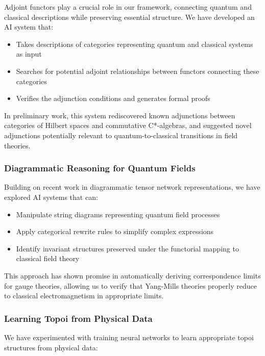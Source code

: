 Adjoint functors play a crucial role in our framework, connecting quantum and classical descriptions while preserving essential structure. We have developed an AI system that:

\begin{itemize}
    \item Takes descriptions of categories representing quantum and classical systems as input
    \item Searches for potential adjoint relationships between functors connecting these categories
    \item Verifies the adjunction conditions and generates formal proofs
\end{itemize}

In preliminary work, this system rediscovered known adjunctions between categories of Hilbert spaces and commutative C*-algebras, and suggested novel adjunctions potentially relevant to quantum-to-classical transitions in field theories.

\subsubsection{Diagrammatic Reasoning for Quantum Fields}

Building on recent work in diagrammatic tensor network representations, we have explored AI systems that can:

\begin{itemize}
    \item Manipulate string diagrams representing quantum field processes
    \item Apply categorical rewrite rules to simplify complex expressions
    \item Identify invariant structures preserved under the functorial mapping to classical field theory
\end{itemize}

This approach has shown promise in automatically deriving correspondence limits for gauge theories, allowing us to verify that Yang-Mills theories properly reduce to classical electromagnetism in appropriate limits.

\subsubsection{Learning Topoi from Physical Data}

We have experimented with training neural networks to learn appropriate topoi structures from physical data:

